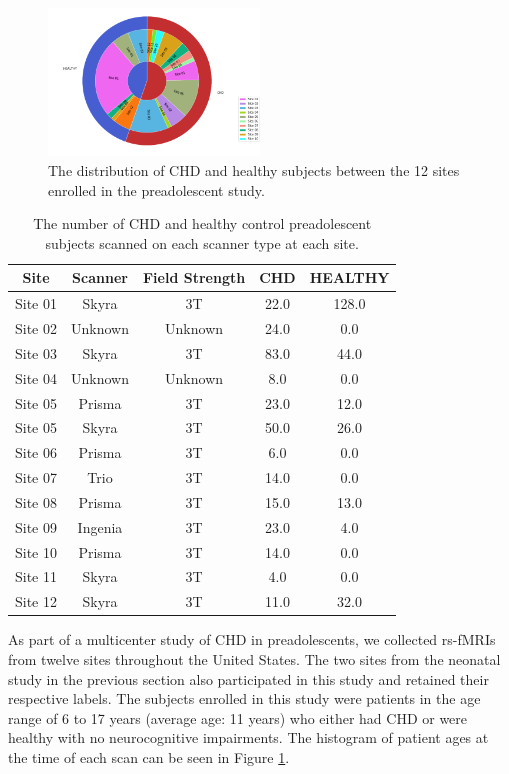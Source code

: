 \begin{figure}
\centering
\includegraphics[width=0.5\textwidth]{5/demo_pread_subj_cohort.png}
\caption{The distribution of CHD and healthy subjects between the 12 sites enrolled in the preadolescent study.}
\label{fig:pread_ages}
\end{figure}

\begin{table}[]
\centering
\caption{The number of CHD and healthy control preadolescent subjects scanned on each scanner type at each site.}
\label{tab:pread-site-counts}
\begin{tabular}{|c|c|c|c|c|}
\hline
\textbf{Site} & \textbf{Scanner} & \textbf{Field Strength} & \textbf{CHD} & \textbf{HEALTHY} \\ \hline
Site 01 & Skyra   & 3T & 22.0 & 128.0 \\ \hline
Site 02 & Unknown & Unknown & 24.0 & 0.0   \\ \hline
Site 03 & Skyra   & 3T & 83.0 & 44.0  \\ \hline
Site 04 & Unknown & Unknown  & 8.0  & 0.0   \\ \hline
Site 05 & Prisma  & 3T & 23.0 & 12.0  \\ \hline
Site 05 & Skyra   & 3T & 50.0 & 26.0  \\ \hline
Site 06 & Prisma  & 3T & 6.0  & 0.0   \\ \hline
Site 07 & Trio    & 3T & 14.0 & 0.0   \\ \hline
Site 08 & Prisma  & 3T & 15.0 & 13.0  \\ \hline
Site 09 & Ingenia & 3T & 23.0 & 4.0   \\ \hline
Site 10 & Prisma  & 3T & 14.0 & 0.0   \\ \hline
Site 11 & Skyra   & 3T & 4.0  & 0.0   \\ \hline
Site 12 & Skyra   & 3T & 11.0 & 32.0  \\ \hline
\end{tabular}
\end{table}

As part of a multicenter study of CHD in preadolescents, we collected rs-fMRIs from twelve sites throughout the United States. The two sites from the neonatal study in the previous section also participated in this study and retained their respective labels. The subjects enrolled in this study were patients in the age range of 6 to 17 years (average age: 11 years) who either had CHD or were healthy with no neurocognitive impairments. The histogram of patient ages at the time of each scan can be seen in Figure \ref{fig:pread_ages}.

